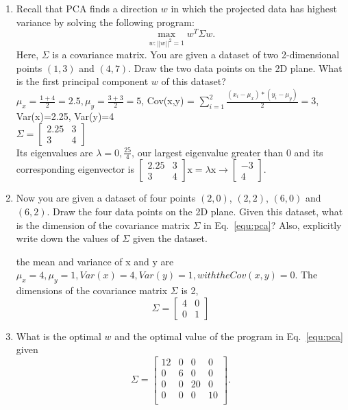 \begin{Q}
\begin{enumerate}
\item Recall that PCA finds a direction $w$ in which the projected data has highest variance by solving the following program:
	\begin{equation}
	\max_{w:||w||^2=1}w^T\Sigma w.
	\label{equ:pca}
	\end{equation}
	Here, $\Sigma$ is a covariance matrix. You are given a dataset of two 2-dimensional points $(1,3)$ and $(4,7)$. Draw the two data points on the 2D plane. What is the first principal component $w$ of this dataset?\\

$\mu_{x} = \frac{1+4}{2}=2.5, \mu_{y} = \frac{3+3}{2}=5$,  Cov(x,y) = $\sum^{2}_{i=1} \frac{(x_{i}-\mu_{x})*(y_{i}-\mu_{y})}{2} = 3$, Var(x)=2.25, Var(y)=4\\
$\Sigma = \left[ \begin{matrix}
2.25 & 3\\ 3 & 4 \end{matrix} \right]$\\
Its eigenvalues are $\lambda = 0, \frac{25}{4}$, our largest eigenvalue greater than 0 and its corresponding eigenvector is 
$\left[ \begin{matrix} 2.25 & 3\\ 3 & 4 \end{matrix} \right]\text{x} = \lambda\text{x} \rightarrow \left[ \begin{matrix} -3\\ 4 \end{matrix} \right]$.
\\


\item Now you are given a dataset of four points $(2,0)$, $(2,2)$, $(6,0)$ and $(6,2)$. Draw the four data points on the 2D plane. Given this dataset, what is the dimension of the covariance matrix $\Sigma$ in Eq.~\eqref{equ:pca}? Also, explicitly write down the values of $\Sigma$ given the dataset.

the mean and variance of x and y are $\mu_x = 4, \mu_y = 1, Var(x) = 4, Var(y) = 1,with the Cov(x,y) = 0$. The dimensions of the covariance matrix $\Sigma$ is 2, $$\Sigma = \left[\begin{matrix} 4 & 0 \\ 0 & 1\end{matrix} \right]$$

\item What is the optimal $w$ and the optimal value of the program in Eq.~\eqref{equ:pca}  given \[ \Sigma= \left[ \begin{array}{cccc}
	12 & 0 & 0 & 0\\
	0 & 6 & 0 & 0\\
	0 & 0 & 20 & 0\\
	0 & 0 & 0 & 10\\
	\end{array} \right].\] 
	

\end{enumerate}
\end{Q}
